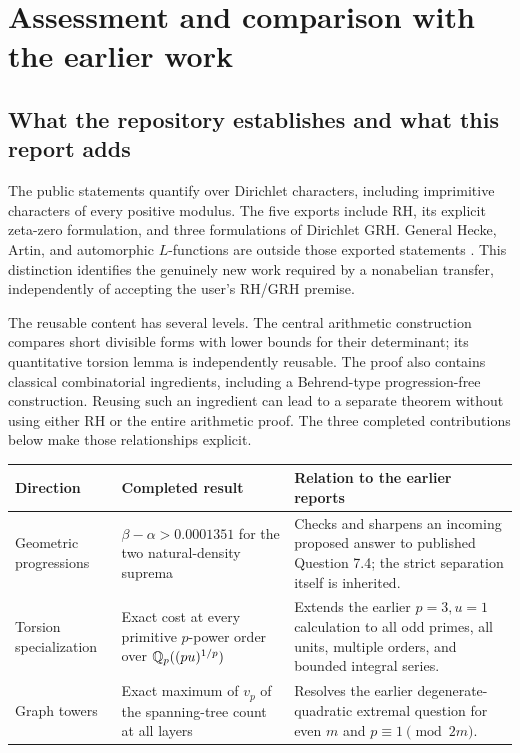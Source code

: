 \section{Assessment and comparison with the earlier work}

\subsection{What the repository establishes and what this report adds}
The public statements quantify over Dirichlet characters, including imprimitive
characters of every positive modulus. The five exports include RH, its explicit
zeta-zero formulation, and three formulations of Dirichlet GRH. General Hecke,
Artin, and automorphic $L$-functions are outside those exported statements
\cite{upstream}. This distinction identifies the genuinely new work required by
a nonabelian transfer, independently of accepting the user's RH/GRH premise.

The reusable content has several levels. The central arithmetic construction
compares short divisible forms with lower bounds for their determinant; its
quantitative torsion lemma is independently reusable. The proof also contains
classical combinatorial ingredients, including a Behrend-type progression-free
construction. Reusing such an ingredient can lead to a separate theorem without
using either RH or the entire arithmetic proof. The three completed contributions
below make those relationships explicit.

\begin{center}\small
\begin{tabular}{p{}p{}p{}}
\toprule
Direction & Completed result & Relation to the earlier reports\\
\midrule
Geometric progressions & $\beta-\alpha>0.0001351$ for the two natural-density suprema &
Checks and sharpens an incoming proposed answer to published Question 7.4; the strict separation itself is inherited.\\[5pt]
Torsion specialization & Exact cost at every primitive $p$-power order over
$\mathbb Q_p((pu)^{1/p})$ & Extends the earlier $p=3,u=1$ calculation to all odd primes,
all units, multiple orders, and bounded integral series.\\[5pt]
Graph towers & Exact maximum of $v_p$ of the spanning-tree count at all layers &
Resolves the earlier degenerate-quadratic extremal question for even $m$ and
$p\equiv1\pmod{2m}$.\\
\bottomrule
\end{tabular}
\end{center}

